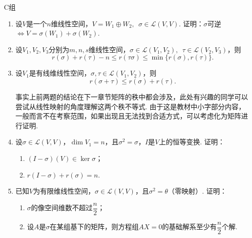 \centerline{\heiti C组}
\begin{enumerate}
    \item 设$V$是一个$n$维线性空间，$V=W_1\oplus W_2,\enspace\sigma\in \mathcal{L}(V,V)$. 证明：$\sigma$可逆$\iff V=\sigma(W_1)+\sigma(W_2)$.

    \item 设$V_1,V_2,V_3$分别为$m,n,s$维线性空间，$\sigma\in \mathcal{L}(V_1,V_2),\enspace\tau\in \mathcal{L}(V_2,V_3)$，则
          \[r(\sigma)+r(\tau)-n \leqslant r(\tau\sigma) \leqslant \min\{r(\sigma),r(\tau)\}.\]

    \item 设$V_1$是有线维线性空间，$\sigma,\tau\in \mathcal{L}(V_1,V_2)$，则
          \[r(\sigma+\tau) \leqslant r(\sigma)+r(\tau).\]

          事实上前两题的结论在下一章节矩阵的秩中都会涉及，此处有兴趣的同学可以尝试从线性映射的角度理解这两个秩不等式. 由于这是教材中小字部分内容，一般而言不在考察范围，如果出现且无法找到合适方式，可以考虑化为矩阵进行证明.

    \item 设$\sigma\in \mathcal{L}(V,V)$，$\dim V_1=n$，且$\sigma^2=\sigma$，$I$是$V$上的恒等变换. 证明：
          \begin{enumerate}
              \item $(I-\sigma)(V) \in \ker\sigma$；

              \item $r(I-\sigma)+r(\sigma)=n$.
          \end{enumerate}

    \item 已知$V$为有限维线性空间，$\sigma\in \mathcal{L}(V,V)$，且$\sigma^2=\theta$（零映射）. 证明：
          \begin{enumerate}
              \item $\sigma$的像空间维数不超过$\dfrac{n}{2}$；

              \item 设$A$是$\sigma$在某组基下的矩阵，则方程组$AX=0$的基础解系至少有$\dfrac{n}{2}$个解.
          \end{enumerate}
\end{enumerate}

